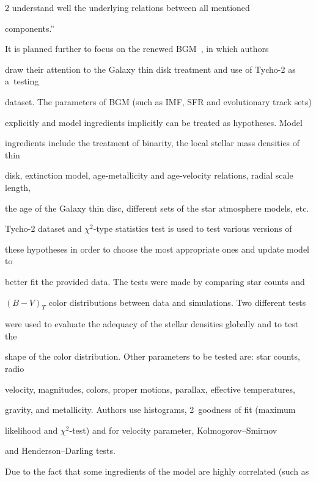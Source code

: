 \begin{multicols}{2}
understand well the underlying relations between all mentioned


components.''





  It is planned further to focus on the renewed BGM~\cite{57-kl}, in which authors


draw their attention to the Galaxy thin disk treatment and use of Tycho-2 as a~testing


dataset. The parameters of BGM (such as IMF, SFR and evolutionary track sets)


explicitly and model ingredients implicitly can be treated as hypotheses. Model


ingredients include the treatment of binarity, the local stellar mass densities of thin


disk, extinction model,  age-metallicity and age-velocity relations, radial scale length,


the age of the Galaxy thin disc, different sets of the star atmosphere models, etc.





  Tycho-2 dataset  and $\chi^2$-type statistics test is used to test various versions of


these hypotheses in order to choose the most appropriate ones and update model to


better fit the provided data. The tests were made by comparing star counts and


  $(B-V)_T$ color distributions between data and simulations. Two different tests


were used to evaluate the adequacy of the stellar densities globally and to test the


shape of the color distribution. Other parameters to be tested are: star counts, radio


velocity, magnitudes, colors, proper motions, parallax, effective temperatures,


gravity, and metallicity. Authors use histograms, 2~goodness of fit (maximum


likelihood and $\chi^2$-test) and for velocity parameter, Kolmogorov--Smirnov


and Henderson--Darling tests.





  Due to the fact that some ingredients of the model are highly correlated (such as



\end{multicols}
